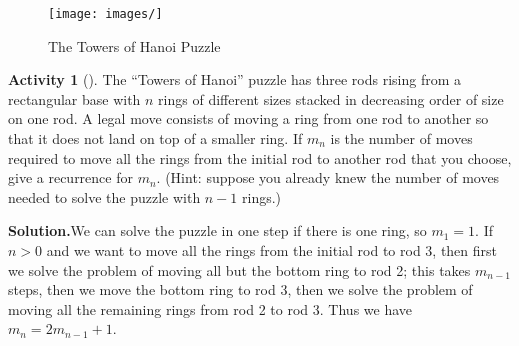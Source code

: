 \documentclass[10pt,]{book}
\theoremstyle{plain}
\theoremstyle{definition}
\newtheorem{activity}[project]{Activity}
\numberwithin{equation}{chapter}
\begin{document}
\begin{figure}
\centering
\texttt{[image: images/]}
\caption{The Towers of Hanoi Puzzle\label{Hanoi}}
\end{figure}
\begin{activity}[]\label{HanoiProblem}
The ``Towers of Hanoi'' puzzle has three rods rising from a rectangular base with \(n\) rings of different sizes stacked in decreasing order of size on one rod. A legal move consists of moving a ring from one rod to another so that it does not land on top of a smaller ring. If \(m_n\) is the number of moves required to move all the rings from the initial rod to another rod that you choose, give a recurrence for \(m_n\). (Hint: suppose you already knew the number of moves needed to solve the puzzle with \(n-1\) rings.)%
\par\medskip\noindent%
\textbf{Solution.}\quad We can solve the puzzle in one step if there is one ring, so \(m_1=1\). If \(n>0\) and we want to move all the rings from the initial rod to rod 3, then first we solve the problem of moving all but the bottom ring to rod 2; this takes \(m_{n-1}\) steps, then we move the bottom ring to rod 3, then we solve the problem of moving all the remaining rings from rod 2 to rod 3. Thus we have \(m_n=2m_{n-1}+1\).%
\end{activity}
\end{document}
